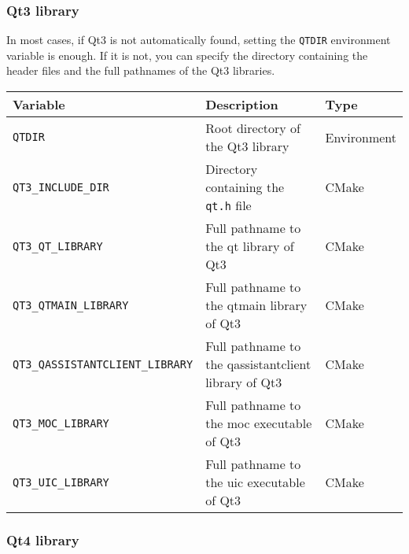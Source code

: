\subsubsection{Qt3 library}

In most cases, if Qt3 is not automatically found, setting the \texttt{QTDIR} 
environment variable is enough. If it is not, you can specify the directory containing 
the header files and the full pathnames of the Qt3 libraries.

\renewcommand{\arraystretch}{1.3}
\gdef\lcTabularBorder{2}
\begin{tabular}{|l|l|l|} \hline
  \textbf{Variable}                       & \textbf{Description}                                  & \textbf{Type}\\\hline\hline
  \texttt{QTDIR}                          & Root directory of the Qt3 library                     & Environment\\\hline
  \texttt{QT3\_INCLUDE\_DIR}              & Directory containing the \texttt{qt.h} file           & CMake\\\hline
  \texttt{QT3\_QT\_LIBRARY}               & Full pathname to the qt library of Qt3                & CMake\\\hline
  \texttt{QT3\_QTMAIN\_LIBRARY}           & Full pathname to the qtmain library of Qt3            & CMake\\\hline
  \texttt{QT3\_QASSISTANTCLIENT\_LIBRARY} & Full pathname to the qassistantclient library of Qt3  & CMake\\\hline
  \texttt{QT3\_MOC\_LIBRARY}              & Full pathname to the moc executable of Qt3             & CMake\\\hline
  \texttt{QT3\_UIC\_LIBRARY}              & Full pathname to the uic executable of Qt3             & CMake\\\hline
\end{tabular}

\subsubsection{Qt4 library}

